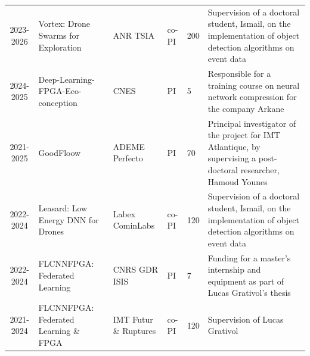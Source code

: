 \documentclass[11pt]{report}
\begin{document}
\begin{landscape}
{\begin{longtable}{|c|l|p{3cm}|p{}|p{1.5cm}|p{6.5cm}|}
      2023-2026     & Vortex: Drone Swarms for Exploration  & ANR TSIA              & co-PI         & 200                  & Supervision of a doctoral student, Ismail, on the implementation of object detection algorithms on event data           \\
      2024-2025     & Deep-Learning-FPGA-Eco-conception     & CNES                  & PI            & 5                    & Responsible for a training course on neural network compression for the company Arkane                                  \\
      2021-2025     & GoodFloow                             & ADEME Perfecto        & PI            & 70                   & Principal investigator of the project for IMT Atlantique, by supervising a post-doctoral researcher, Hamoud Younes      \\
      2022-2024     & Leasard: Low Energy DNN for Drones    & Labex CominLabs       & co-PI         & 120                  & Supervision of a doctoral student, Ismail, on the implementation of object detection algorithms on event data           \\
      2022-2024     & FLCNNFPGA: Federated Learning         & CNRS GDR ISIS         & PI            & 7                    & Funding for a master's internship and equipment as part of Lucas Grativol's thesis                                      \\
      2021-2024     & FLCNNFPGA: Federated Learning \& FPGA & IMT Futur \& Ruptures & co-PI         & 120                  & Supervision of Lucas Grativol                                                                                           \\
    \end{longtable}
  }


\end{landscape}
\end{document}
